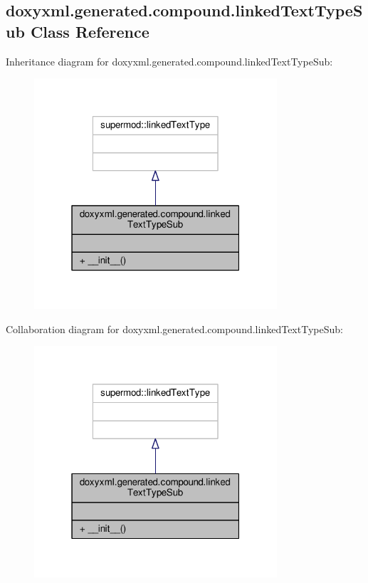 \subsection{doxyxml.\+generated.\+compound.\+linked\+Text\+Type\+Sub Class Reference}
\label{classdoxyxml_1_1generated_1_1compound_1_1linkedTextTypeSub}


Inheritance diagram for doxyxml.\+generated.\+compound.\+linked\+Text\+Type\+Sub\+:
\nopagebreak
\begin{figure}[H]
\begin{center}
\leavevmode
\includegraphics[width=256pt]{d7/d0d/classdoxyxml_1_1generated_1_1compound_1_1linkedTextTypeSub__inherit__graph}
\end{center}
\end{figure}


Collaboration diagram for doxyxml.\+generated.\+compound.\+linked\+Text\+Type\+Sub\+:
\nopagebreak
\begin{figure}[H]
\begin{center}
\leavevmode
\includegraphics[width=256pt]{dd/d89/classdoxyxml_1_1generated_1_1compound_1_1linkedTextTypeSub__coll__graph}
\end{center}
\end{figure}
